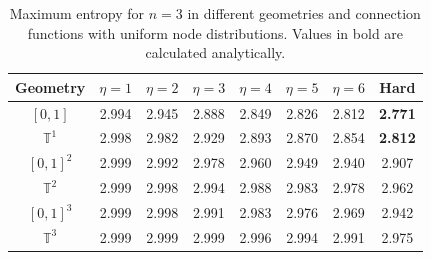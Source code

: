 \documentclass{article}
\begin{document}
\begin{table}[h]
    \centering
    \begin{tabular}{cccccccc}
        \hline
        Geometry & $\eta=1$ & $\eta=2$ & $\eta=3$ & $\eta=4$ & $\eta=5$ & $\eta=6$ & Hard  \\
        \hline
        $[0,1]$    & 2.994 & 2.945 & 2.888 & 2.849 & 2.826 & 2.812 & \textbf{2.771} \\
        $\mathbb{T}^1$       & 2.998 & 2.982 & 2.929 & 2.893 & 2.870 & 2.854 & \textbf{2.812}  \\
        $[0,1]^2$   & 2.999 & 2.992 & 2.978 & 2.960 & 2.949 & 2.940 & 2.907 \\
        $\mathbb{T}^2$ & 2.999 & 2.998 & 2.994 & 2.988 & 2.983 & 2.978 & 2.962 \\
        $[0,1]^3$     & 2.999 & 2.998 & 2.991 & 2.983 & 2.976 & 2.969 & 2.942 \\
        $\mathbb{T}^3$ & 2.999 & 2.999 & 2.999 & 2.996 & 2.994 & 2.991 & 2.975  \\
        \hline
    \end{tabular}
    \caption{Maximum entropy for $n=3$ in different geometries and connection functions with uniform node distributions. Values in bold are calculated analytically.}
    \label{tab:max_entropy}
\end{table}
\end{document}
